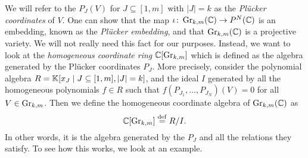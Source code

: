 We will refer to the $P_J(V)$ for $J \subseteq [1,m]$ with $|J| = k$ as the
\emph{Plücker coordinates} of $V$. One can show that the map
$\iota \colon \operatorname{Gr}_{k, m}(\mathbb{C}) \to P^N(\mathbb{C})$ is an embedding, known as the
\emph{Plücker embedding}, and that $\operatorname{Gr}_{k,m}(\mathbb{C})$ is a
projective variety. We will not really need this fact for our purposes. Instead, we
want to look at the \emph{homogeneous coordinate ring} $\mathbb{C}[\operatorname{Gr}_{k,m}]$ which is defined as the algebra generated by the Plücker
coordinates $P_J$. More precisely, consider the polynomial algebra $R = \mathbb{K}[x_J \mid
		J\subseteq [1, m], |J| = k]$, and the ideal $I$ generated by all the homogeneous
polynomials $f \in R$ such that $f(P_{J_1}, \dots, P_{J_N})(V) = 0$ for all $V \in
	\operatorname{Gr}_{k, m}$. Then we define the homogeneous coordinate algebra of $\operatorname{Gr}_{k,m}(\mathbb{C})$ as
\begin{equation*}
	\mathbb{C}[\operatorname{Gr}_{k,m}] \overset{\mathrm{def}}{=} R / I.
\end{equation*}
%
In other words, it is the algebra generated by the $P_J$ and all the relations they
satisfy. To see how this works, we look at an example.
